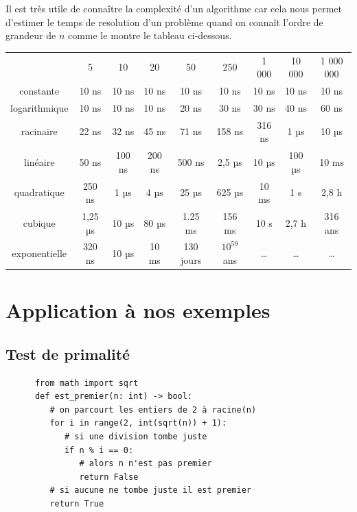Il est très utile de connaître la complexité d'un algorithme car cela nous permet d'estimer le temps de resolution d'un problème quand on connaît l'ordre de grandeur de $n$ comme le montre le tableau ci-dessous.
\begin{center}

\tabularstyled
\renewcommand{\arraystretch}{1.5}
\scriptsize
\begin{tabular}{c|c|c|c|c|c|c|c|c}
\rowcolor{UGLiOrange}
& {\boxfont\color{white}5} & {\boxfont\color{white}10} & {\boxfont\color{white}20} & {\boxfont\color{white}50} & {\boxfont\color{white}250} & {\boxfont\color{white}1 000} & {\boxfont\color{white}10 000} & {\boxfont\color{white}1 000 000} \\
constante & 10 ns & 10 ns & 10 ns & 10 ns & 10 ns & 10 ns & 10 ns & 10 ns \\
logarithmique & 10 ns & 10 ns & 10 ns & 20 ns  & 30 ns & 30 ns & 40 ns & 60 ns \\
racinaire & 22 ns & 32 ns & 45 ns & 71 ns & 158 ns & 316 ns & 1 µs & 10 µs \\
linéaire & 50 ns & 100 ns & 200 ns & 500 ns & 2,5 µs & 10 µs & 100 µs & 10 ms \\
quadratique & 250 ns & 1 µs & 4 µs & 25 µs & 625 µs & 10 ms & 1 s & 2,8 h \\
cubique & 1,25 µs & 10 µs & 80 µs & 1.25 ms & 156 ms & 10 s & 2,7 h & 316 ans \\
exponentielle & 320 ns & 10 µs & 10 ms & 130 jours & $10^{59}$ ans & \ldots & \ldots & \ldots \\
\end{tabular}
\renewcommand{\arraystretch}{1}
\end{center}


\section{Application à nos exemples}

\subsection{Test de primalité}

\begin{pyc}
   \begin{verbatim}
      from math import sqrt
      def est_premier(n: int) -> bool:
         # on parcourt les entiers de 2 à racine(n)
         for i in range(2, int(sqrt(n)) + 1):
            # si une division tombe juste
            if n % i == 0:
               # alors n n'est pas premier
               return False
         # si aucune ne tombe juste il est premier
         return True
   \end{verbatim}
\end{pyc}

